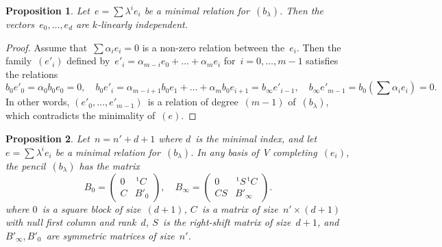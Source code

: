 \documentclass{article}%
\newtheorem{prop}{Proposition}
\def\transpose{\,{}^{\mathrm{t}\!}}
\def\mat#1{\begin{pmatrix}#1\end{pmatrix}}
\begin{document}
\begin{prop}\label{prop:minimal-indep}
Let~$e = ∑ λ^i e_i$ be a minimal relation for~$(b_{λ})$. Then the
vectors~$e_0,…,e_{d}$ are $k$-linearly independent.
\end{prop}

\begin{proof}
Assume that~$∑ α_i e_i = 0$ is a non-zero relation between the~$e_i$.
Then the family~$(e'_i)$ defined by~$e'_i = α_{m-i} e_0 + … + α_m
e_{i}$ for~$i = 0, …, m-1$ satisfies the relations
\begin{equation}\label{eq:relation-e'}
b_0 e'_0 = α_0 b_0 e_0 = 0, \quad
b_0 e'_{i} = α_{m-i+1} b_0 e_1 + … + α_{m} b_0 e_{i+1} = b_{∞} e'_{i-1}, \quad
b_{∞} e'_{m-1} = b_0(∑ α_i e_i) = 0.
\end{equation}
In other words, $(e'_0,…, e'_{m-1})$~is a relation of degree~$(m-1)$
of~$(b_{λ})$, which contradicts the minimality of~$(e)$.
\end{proof}


\begin{prop}\label{prop:minimal-matrix}
Let~$n = n'+d+1$ where $d$~is the minimal index, and let~$e = ∑ λ^i
e_i$ be a minimal relation for~$(b_{λ})$. In any basis of~$V$
completing~$(e_i)$, the pencil~$(b_{λ})$ has the matrix
\begin{equation}\label{eq:minimal-matrix}
B_{0} = \mat{0 & \transpose{C}\\ C & B'_{0}}, \quad
B_{∞} = \mat{0 & \transpose{S} \transpose{C}\\ CS & B'_{∞}}.
\end{equation}
where $0$~is a square block of size~$(d+1)$, $C$~is a matrix of size~$n'
× (d+1)$ with null first column and rank~$d$, $S$~is the right-shift
matrix of size~$d+1$, and $B'_{∞}, B'_0$~are symmetric matrices of
size~$n'$.
\end{prop}
\end{document}
